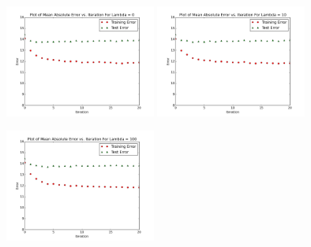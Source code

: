 \documentclass[10.5pt]{article}
\newcommand{\factwidth}{0.44}
\newcommand{\factheight}{1.6in}
\begin{document}
\begin{figure}[H]
\centering
\includegraphics[width=0\factwidth\textwidth,height=\factheight]{matrix_plots/test-i40d10l0.png}
\includegraphics[width=0\factwidth\textwidth,height=\factheight]{matrix_plots/test-i40d10l10.png}
\includegraphics[width=0\factwidth\textwidth,height=\factheight]{matrix_plots/test-i40d10l100.png}

\end{figure}
\end{document}
